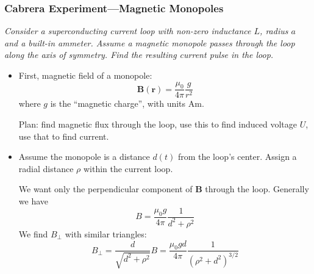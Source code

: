 \documentclass[11pt, a4paper]{article}
\renewcommand{\vec}[1]{\bm{#1}} %
\renewcommand{\r}{\vec{r}}
\newcommand{\B}{\vec{B}} %
\newcommand{\mm}{\mu_{0}}  %
\newcommand{\m}{\vec{m}} %
\begin{document}
\subsubsection{Cabrera Experiment---Magnetic Monopoles}
\textit{Consider a superconducting current loop with non-zero inductance $ L$, radius $ a $ and a built-in ammeter. Assume a magnetic monopole passes through the loop along the axis of symmetry. Find the resulting current pulse in the loop.}
\begin{itemize}
	\item First, magnetic field of a monopole:
	\begin{equation*}
		\B(\r) = \frac{\mm}{4\pi} \frac{g}{r^{2}}
	\end{equation*}
	where $ g $ is the ``magnetic charge'', with units $ \si{\ampere \meter} $.
	
	
	Plan: find magnetic flux through the loop, use this to find induced voltage $ U $, use that to find current.
	
	\item Assume the monopole is a distance $ d(t) $ from the loop's center. Assign a radial distance $ \rho $ within the current loop. 
	
	We want only the perpendicular component of $ \B $ through the loop. Generally we have
	\begin{equation*}
		B = \frac{\mm g}{4\pi}\frac{1}{d^{2} + \rho^{2}}
	\end{equation*}
	We find $ B_{\perp} $ with similar triangles:
	\begin{equation*}
		B_{\perp} = \frac{d}{\sqrt{d^{2} + \rho^{2}}} B = \frac{\mm g d}{4\pi}\frac{1}{(\rho^{2} + d^{2})^{3/2}}
	\end{equation*}
	

\end{itemize}
\end{document}
